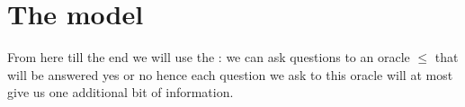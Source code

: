 \section{The model}
\label{tree:sorting:model}

From here till the end we will use the  : we can ask questions to an oracle $\le$ that will be answered yes or no hence each question we ask to this oracle will at most give us one additional bit of information.
